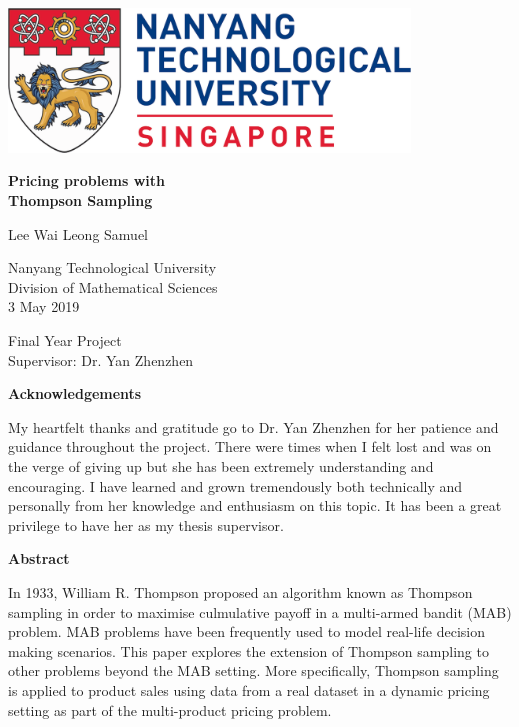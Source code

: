 \documentclass[a4paper]{article}
\begin{document}
\begin{titlepage}
	\begin{center}
		
		\includegraphics[width=0.8\textwidth]{NTU.png}
		\vspace{2cm}
		
		\huge
		
		\textbf{Pricing problems with \\Thompson Sampling}
		
		\vspace{1cm}
		\Large
		Lee Wai Leong Samuel
		
		\vspace{2cm}
		\Large
		Nanyang Technological University\\
		Division of Mathematical Sciences\\
		3 May 2019
		
		\vfill
		
		Final Year Project\\
		Supervisor: Dr. Yan Zhenzhen
		
		\vspace{0.8cm}
		
	\end{center}
\end{titlepage}
\begin{center}
	\large
	\textbf{Acknowledgements}
	\vspace{1cm}
\end{center}	
\large
My heartfelt thanks and gratitude go to Dr. Yan Zhenzhen for her patience and guidance throughout the project. There were times when I felt lost and was on the verge of giving up but she has been extremely understanding and encouraging. I have learned and grown tremendously both technically and personally from her knowledge and enthusiasm on this topic. It has been a great privilege to have her as my thesis supervisor.

\pagebreak
\begin{center}
	\large
	\textbf{Abstract}
	\vspace{1cm}
\end{center}	
	\large
	In 1933, William R. Thompson proposed an algorithm known as Thompson sampling in order to maximise culmulative payoff in a multi-armed bandit (MAB) problem. MAB problems have been frequently used to model real-life decision making scenarios. This paper explores the extension of Thompson sampling to other problems beyond the MAB setting. More specifically, Thompson sampling is applied to product sales using data from a real dataset in a dynamic pricing setting as part of the multi-product pricing problem. 
\end{document}
